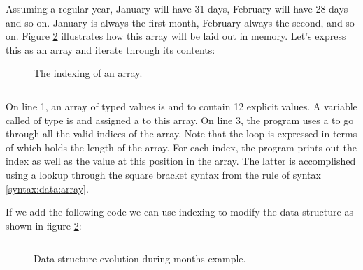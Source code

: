 Assuming a regular year, January will have 31 days, February will have 28 days and so on. January is always the first month, February always the second, and so on. Figure \ref{fig:data:array:index} illustrates how this array will be laid out in memory. Let's express this as an array and iterate through its contents:

\begin{figure}[tbp]
  
  \caption{The indexing of an array.}
  \label{fig:data:array:index}
\end{figure}

\inputminted[linenos,lastline=5]{csharp}{../src/csharp/primdata/months/Program.cs}

On line 1, an array of  typed values is  and  to contain 12 explicit values. A variable called  of type  is  and assigned a  to this array. On line 3, the program uses a  to go through all the valid indices of the array. Note that the loop  is expressed in terms of  which holds the length of the array. For each index, the program prints out the index as well as the value at this position in the array. The latter is accomplished using a lookup through the square bracket syntax from the  rule of syntax \ref{syntax:data:array}.

%
%

If we add the following code we can use indexing to modify the data structure as shown in figure \ref{fig:data:array:index}:

\inputminted[firstline=9,lastline=10]{csharp}{../src/csharp/primdata/months/Program.cs}

\begin{figure}[tbp]
  
  \caption{Data structure evolution during months example.}
  \label{fig:data:array:index}
\end{figure}

